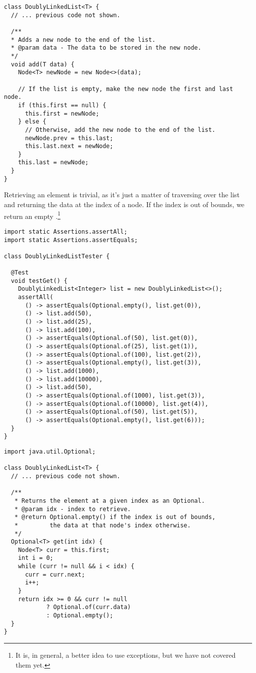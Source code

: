 \begin{lstlisting}[language=MyJava]
class DoublyLinkedList<T> {
  // ... previous code not shown.

  /**
  * Adds a new node to the end of the list.
  * @param data - The data to be stored in the new node.
  */
  void add(T data) {
    Node<T> newNode = new Node<>(data);

    // If the list is empty, make the new node the first and last node.
    if (this.first == null) {
      this.first = newNode;
    } else {
      // Otherwise, add the new node to the end of the list.
      newNode.prev = this.last;
      this.last.next = newNode;
    }
    this.last = newNode;
  }
}
\end{lstlisting}

Retrieving an element is trivial, as it's just a matter of traversing over the list and returning the data at the index of a node. If the index is out of bounds, we return an empty .\footnote{It is, in general, a better idea to use exceptions, but we have not covered them yet.}

\begin{lstlisting}[language=MyJava]
import static Assertions.assertAll;
import static Assertions.assertEquals;

class DoublyLinkedListTester {

  @Test
  void testGet() {
    DoublyLinkedList<Integer> list = new DoublyLinkedList<>();
    assertAll(
      () -> assertEquals(Optional.empty(), list.get(0)),
      () -> list.add(50),
      () -> list.add(25),
      () -> list.add(100),
      () -> assertEquals(Optional.of(50), list.get(0)),
      () -> assertEquals(Optional.of(25), list.get(1)),
      () -> assertEquals(Optional.of(100), list.get(2)),
      () -> assertEquals(Optional.empty(), list.get(3)),
      () -> list.add(1000),
      () -> list.add(10000),
      () -> list.add(50),
      () -> assertEquals(Optional.of(1000), list.get(3)),
      () -> assertEquals(Optional.of(10000), list.get(4)),
      () -> assertEquals(Optional.of(50), list.get(5)),
      () -> assertEquals(Optional.empty(), list.get(6)));
  }
}
\end{lstlisting}

\begin{lstlisting}[language=MyJava]
import java.util.Optional;

class DoublyLinkedList<T> {
  // ... previous code not shown.

  /**
   * Returns the element at a given index as an Optional.
   * @param idx - index to retrieve.
   * @return Optional.empty() if the index is out of bounds,
   *         the data at that node's index otherwise.
   */
  Optional<T> get(int idx) {
    Node<T> curr = this.first;
    int i = 0;
    while (curr != null && i < idx) {
      curr = curr.next;
      i++;
    }
    return idx >= 0 && curr != null
            ? Optional.of(curr.data)
            : Optional.empty();
  }
}
\end{lstlisting}

